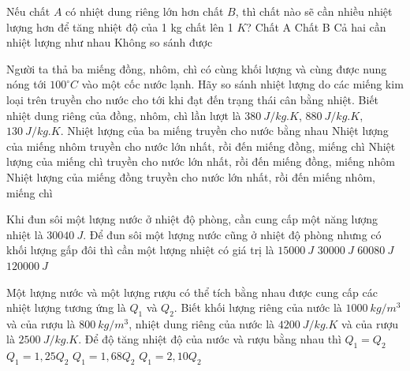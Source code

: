 \begin{ex}
	Nếu chất $A$ có nhiệt dung riêng lớn hơn chất $B$, thì chất nào sẽ cần nhiều nhiệt lượng hơn để tăng nhiệt độ của 1 kg chất lên 1 $K$?
	\choice
	{\True Chất A}
	{Chất B}
	{Cả hai cần nhiệt lượng như nhau}
	{Không so sánh được}
	\end{ex}

\begin{ex}
	Người ta thả ba miếng đồng, nhôm, chì có cùng khối lượng và cùng được nung nóng tới $100^\circ C$ vào một cốc nước lạnh. Hãy so sánh nhiệt lượng do các miếng kim loại trên truyền cho nước cho tới khi đạt đến trạng thái cân bằng nhiệt. Biết nhiệt dung riêng của đồng, nhôm, chì lần lượt là $380 \ J/kg. K$, $880 \ J/kg. K$, $130 \ J/kg. K$.
	\choice
	{Nhiệt lượng của ba miếng truyền cho nước bằng nhau}
	{\True Nhiệt lượng của miếng nhôm truyền cho nước lớn nhất, rồi đến miếng đồng, miếng chì}
	{Nhiệt lượng của miếng chì truyền cho nước lớn nhất, rồi đến miếng đồng, miếng nhôm}
	{Nhiệt lượng của miếng đồng truyền cho nước lớn nhất, rồi đến miếng nhôm, miếng chì}
	\end{ex}
\begin{ex}
	Khi đun sôi một lượng nước ở nhiệt độ phòng, cần cung cấp một năng lượng nhiệt là $30040\ J$. Để đun sôi một lượng nước cũng ở nhiệt độ phòng nhưng có khối lượng gấp đôi thì cần một lượng nhiệt có giá trị là
	\choice
	{$15000\ J$}
	{$30000\ J$}
	{\True $60080\ J$}
	{$120000\ J$}
	\end{ex}

%
\begin{ex}
	Một lượng nước và một lượng rượu có thể tích bằng nhau được cung cấp các nhiệt lượng tương ứng là $Q_1$ và $Q_2$. Biết khối lượng riêng của nước là $1000\ kg / m^3$ và của rượu là $800\ kg / m^3$, nhiệt dung riêng của nước là $4200\ J/kg.K$ và của rượu là $2500\ J / kg. K$. Để độ tăng nhiệt độ của nước và rượu bằng nhau thì
	\choice
	{$Q_1=Q_2$}
	{$Q_1=1,25 Q_2$}
	{$Q_1=1,68 Q_2$}
	{\True $Q_1=2,10 Q_2$}
	\end{ex} 


